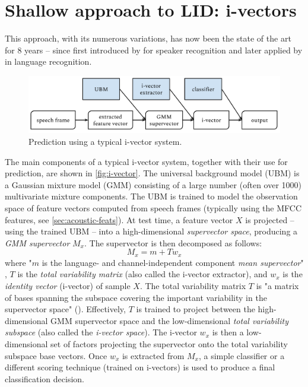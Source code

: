 \documentclass[bsc,frontabs,twoside,singlespacing,parskip,deptreport]{infthesis}
\begin{document}
{  \section{Shallow approach to LID: i-vectors}{
    \label{sec:i-vectors}
    This approach, with its numerous variations, has now been the state of the art for 8 years -- since first introduced by \cite{Dehak_et_al_2011} for speaker recognition and later applied by \cite{Martinez_et_al_2011} in language recognition.
    
    \begin{figure}[h!]
      \centering
      \includegraphics[width=14.5cm]{graphics/i-vectors}
      \vspace*{-1em}
      \caption{Prediction using a typical i-vector system.}
      \label{fig:i-vector}
    \end{figure}

    The main components of a typical i-vector system, together with their use for prediction, are shown in \autoref{fig:i-vector}. The universal background model (UBM) is a Gaussian mixture model (GMM) consisting of a large number (often over 1000) multivariate mixture components. The UBM is trained to model the observation space of feature vectors computed from speech frames (typically using the MFCC features, see \autoref{sec:acoustic-feats}). At test time, a feature vector $X$ is projected -- using the trained UBM -- into a high-dimensional \textit{supervector space}, producing a \textit{GMM supervector} $M_x$. The supervector is then decomposed as follows:
    $$M_x = m + Tw_x$$
    where "$m$ is the language- and channel-independent component \textit{mean supervector}" \citep[p.862]{Martinez_et_al_2011}, $T$ is the \textit{total variability matrix} (also called the i-vector extractor), and $w_x$ is the \textit{identity vector} (i-vector) of sample $X$. The total variability matrix $T$ is "a matrix of bases spanning the subspace covering the important variability in the supervector space" (\citeauthor[p.862]{Martinez_et_al_2011}). Effectively, $T$ is trained to project between the high-dimensional GMM supervector space and the low-dimensional \textit{total variability subspace} (also called the \textit{i-vector space}). The i-vector $w_x$ is then a low-dimensional set of factors projecting the supervector onto the total variability subspace base vectors. Once $w_x$ is extracted from $M_x$, a simple classifier or a different scoring technique (trained on i-vectors) is used to produce a final classification decision.
    
}}
\end{document}
